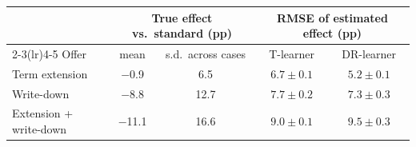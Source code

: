 \begin{tabular}{lcccc}
\toprule
 & \multicolumn{2}{c}{True effect vs.\ standard (pp)} & \multicolumn{2}{c}{RMSE of estimated effect (pp)} \\
\cmidrule(lr){2-3}\cmidrule(lr){4-5}
Offer & mean & s.d.\ across cases & T-learner & DR-learner \\
\midrule
Term extension & $-$0.9 & 6.5 & $6.7 \pm 0.1$ & $5.2 \pm 0.1$ \\
Write-down & $-$8.8 & 12.7 & $7.7 \pm 0.2$ & $7.3 \pm 0.3$ \\
Extension + write-down & $-$11.1 & 16.6 & $9.0 \pm 0.1$ & $9.5 \pm 0.3$ \\
\bottomrule
\end{tabular}
